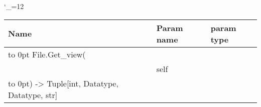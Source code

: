 \begingroup \catcode`\_=12 \tt
\begin{tabular}{lll}
\toprule
\textrm{Name}&\textrm{Param name}&\textrm{param type}\\
\midrule
\hbox to 0pt {File.Get_view(\hss}\\
& self\\
\hbox to 0pt{) -> Tuple[int, Datatype, Datatype, str]\hss}\\
\bottomrule
\end{tabular}
\endgroup
